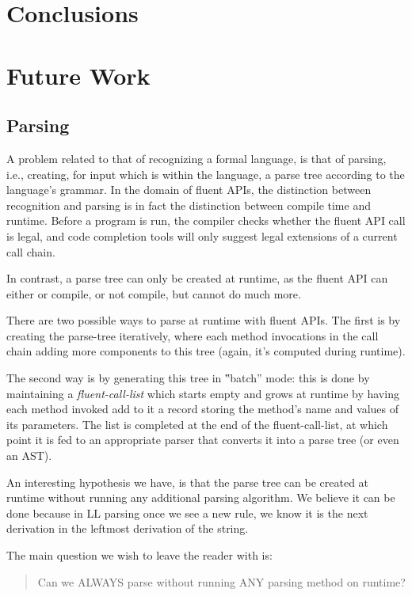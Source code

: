 \section{Conclusions}

\section{Future Work}
\subsection{Parsing}
A problem related to that of recognizing a formal language, is that of parsing,
i.e., creating, for input which is within the language, a parse tree according
to the language's grammar.  In the domain of fluent APIs, the distinction
between recognition and parsing is in fact the distinction between compile time
and runtime.  Before a program is run, the compiler checks whether the fluent
API call is legal, and code completion tools will only suggest legal extensions
of a current call chain.

In contrast, a parse tree can only be created at runtime, as the fluent API can
either or compile, or not compile, but cannot do much more.

There are two possible ways to parse at runtime with fluent APIs.  The first is
by creating the parse-tree iteratively, where each method invocations in the
call chain adding more components to this tree (again, it's computed during
runtime).

The second way is by generating this tree in ‟batch” mode: this is done by
maintaining a \emph{fluent-call-list} which starts empty and grows at runtime
by having each method invoked add to it a record storing the method's name and
values of its parameters.  The list is completed at the end of the
fluent-call-list, at which point it is fed to an appropriate parser that
converts it into a parse tree (or even an AST).

An interesting hypothesis we have, is that the parse tree can be created at
  runtime without running any additional parsing algorithm.
We believe it can be done because in LL parsing once we see a new rule, we 
know it is the next derivation in the leftmost derivation of the string.

The main question we wish to leave the reader with is:
\begin{quote}
  Can we ALWAYS parse without running ANY parsing method on runtime? 
\end{quote}


